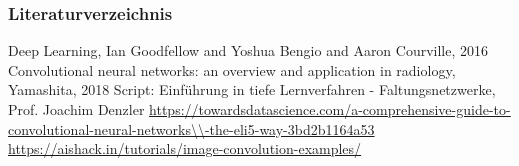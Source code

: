 \documentclass{beamer}
\begin{document}
%
%

\begin{frame}
\frametitle{Literaturverzeichnis}
\begin{scriptsize}
\begin{thebibliography}{1}
 Deep Learning, Ian Goodfellow and Yoshua Bengio and Aaron Courville, 2016
 Convolutional neural networks: an overview and application in radiology, Yamashita, 2018
 Script: Einführung in tiefe Lernverfahren - Faltungsnetzwerke,\\ Prof. Joachim Denzler
 \url{https://towardsdatascience.com/a-comprehensive-guide-to-convolutional-neural-networks\\-the-eli5-way-3bd2b1164a53}
 \url{https://aishack.in/tutorials/image-convolution-examples/}
\end{thebibliography}
\end{scriptsize}

\end{frame}




\end{document}
